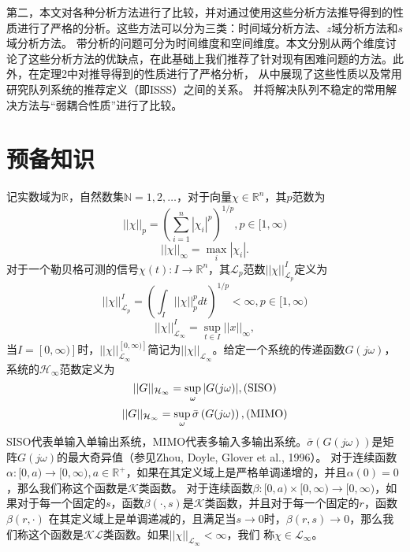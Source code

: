 \begin{translation}
  第二，本文对各种分析方法进行了比较，并对通过使用这些分析方法推导得到的性质进行了严格的分析。这些方法可以分为三类：时间域分析方法、$z$域分析方法和$s$域分析方法。
  带分析的问题可分为时间维度和空间维度。本文分别从两个维度讨论了这些分析方法的优缺点，在此基础上我们推荐了针对现有困难问题的方法。此外，在定理2中对推导得到的性质进行了严格分析，
  从中展现了这些性质以及常用研究队列系统的推荐定义（即ISSS）之间的关系。 并将解决队列不稳定的常用解决方法与“弱耦合性质”进行了比较。

\section{预备知识}
  记实数域为$\mathbb{R}$，自然数集$\mathbb{N}={1, 2, \dots}$，对于向量$\chi \in \mathbb{R}^n$，其$p$范数为
  \begin{equation}
    ||\chi||_p = \left( \sum_{i=1}^n{|\chi_i|^p} \right) ^{1/p}, p \in [1, \infty)
    \label{eq:appendix-equation-1}
  \end{equation}
  \begin{equation}
    ||\chi||_\infty = \max_{i} |\chi_i|.
    \label{eq:appendix-equation-2}
  \end{equation}
  对于一个勒贝格可测的信号$\chi(t):I \rightarrow \mathbb{R}^n$，其$\mathcal{L}_p$范数$||\chi||^I_{\mathcal{L}_p}$定义为
  \begin{equation}
    ||\chi||^I_{\mathcal{L}_p} = \left( \int_I{||\chi||_p^p dt} \right) ^{1/p} < \infty, p \in [1, \infty)
    \label{eq:appendix-equation-3}
  \end{equation}
  \begin{equation}
    ||\chi||^I_{\mathcal{L}_\infty} = \sup_{t \in I} ||x||_\infty,
    \label{eq:appendix-equation-4}
  \end{equation}
  当$I=[0, \infty)]$时，$||\chi||^{[0, \infty)]}_{\mathcal{L}_\infty}$简记为$||\chi||_{\mathcal{L}_\infty}$。给定一个系统的传递函数$G(j\omega)$，系统的$\mathcal{H}_\infty$范数定义为
  \begin{equation}
    ||G||_{\mathcal{H}_\infty} = \sup_{\omega}|G(j\omega)|, {\rm (SISO)}
    \label{eq:appendix-equation-5}
  \end{equation}
  \begin{equation}
    ||G||_{\mathcal{H}_\infty} = \sup_{\omega}\bar{\sigma} \left( G(j\omega) \right), {\rm (MIMO)}
    \label{eq:appendix-equation-6}
  \end{equation}
  SISO代表单输入单输出系统，MIMO代表多输入多输出系统。$\bar{\sigma} \left( G(j\omega) \right)$是矩阵$G(j\omega)$的最大奇异值（参见Zhou, Doyle, Glover et al., 1996）。
  对于连续函数$\alpha:[0, a) \rightarrow [0, \infty), a \in \mathbb{R}^+$，如果在其定义域上是严格单调递增的，并且$\alpha(0) = 0$，那么我们称这个函数是$\mathcal{K}$类函数。
  对于连续函数$\beta:[0, a) \times [0, \infty) \rightarrow [0, \infty)$，如果对于每一个固定的$s$，函数$\beta(\cdot, s)$是$\mathcal{K}$类函数，并且对于每一个固定的$r$，函数$\beta(r, \cdot)$
  在其定义域上是单调递减的，且满足当$s \rightarrow 0$时，$\beta (r, s) \rightarrow 0$，那么我们称这个函数是$\mathcal{KL}$类函数。如果$||\chi||_{\mathcal{L}_\infty} < \infty$，我们
  称$\chi \in \mathcal{L}_\infty$。


\end{translation}
